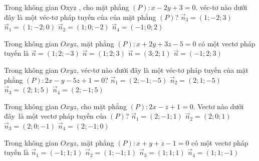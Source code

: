 \begin{ex}%
	Trong không gian Oxyz , cho mặt phẳng $(P)\colon x-2y+3=0$. véc-tơ  nào dưới đây là một véc-tơ
	pháp tuyến của của mặt phẳng  $(P)$?
	\choice 
		{$\overrightarrow{n}_3=(1;-2;3)$} 
		{\True  $\overrightarrow{n}_1=(1;-2;0)$}
		{$\overrightarrow{n}_2=(1;0;-2)$} 
		 {$\overrightarrow{n}_4=(-1;0;2)$}
\end{ex}

\begin{ex}%
	Trong không gian $Oxyz$, mặt phẳng $(P)\colon x+2y+3z-5=0$  có một vectơ pháp tuyến là
	 \choice
		{$\overrightarrow{n}=(1;  2;-3)$}
		{\True $\overrightarrow{n}=(1; 2;  3)$}
		{$\overrightarrow{n}=(3; 2; 1)$} 
		{$\overrightarrow{n}=(-1; 2;  3)$}
\end{ex}

\begin{ex}%
	Trong không gian $Oxyz$, véc-tơ nào dưới đây là một véc-tơ pháp tuyến  của mặt phẳng $\left(P\right)\colon 2x-y-5z+1=0$?
	\choice 
		{\True $\overrightarrow{n}_1=\left(2;-1;-5\right)$} 
		{$\overrightarrow{n}_2=\left(2;1;-5\right)$} 
		 {$\overrightarrow{n}_3=\left(2;1;5\right)$}
		 {$\overrightarrow{n}_4=\left(2;-1;5\right)$}
\end{ex}

\begin{ex}%
	Trong  không gian $Oxyz$, cho mặt phẳng $(P) \colon 2x-z+1=0$. Vectơ nào dưới đây~là một vectơ pháp tuyến của $(P)$?
	 \choice
		 {$\overrightarrow{n}_1=(2;-1;1)$}
		 {$\overrightarrow{n}_2=(2;0;1)$}
		{\True  $\overrightarrow{n}_3=(2;0;-1)$}
		{$\overrightarrow{n}_4=(2;-1;0)$} 
\end{ex}

\begin{ex}%
	Trong không gian $Oxyz$, mặt phẳng  $(P) \colon x+y+z-1=0$ có một vectơ pháp tuyến là
	 \choice
		{$\overrightarrow{n}_{1}  =(-1;1;1)$}
		{$\overrightarrow{n}_{2} = (1;-1;1)$} 
		{\True $\overrightarrow{n}_{3}  = (1;1;1)$}
		{$\overrightarrow{n}_{4} =  (1;1;-1)$}
\end{ex}


